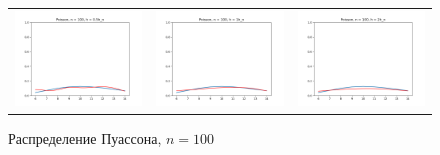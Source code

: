 	\begin{figure}[H]
		\centering
		\begin{tabular}{ccc}
			\includegraphics[width=55mm, height =0.25\textheight]{pics/ker_p_100_1.png}
			&
			\includegraphics[width=55mm, height =0.25\textheight]{pics/ker_p_100_2.png}
			&
			\includegraphics[width=55mm, height =0.25\textheight]{pics/ker_p_100_3.png}
		\end{tabular}
		\caption{Распределение Пуассона, $n = 100$}
		\label{fig:poisson}
	\end{figure}
	
